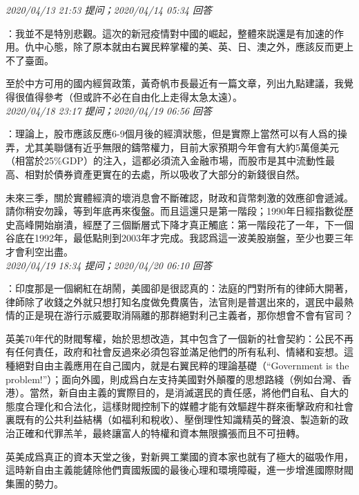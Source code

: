 \documentclass[twocolumn]{ctexart}
\begin{document}
\textit{\hfill\noindent\small 2020/04/13 21:53 提问；2020/04/14 05:34 回答}

：我並不是特別悲觀。這次的新冠疫情對中國的崛起，整體來説還是有加速的作用。仇中心態，除了原本就由右翼民粹掌權的美、英、日、澳之外，應該反而更上不了臺面。

至於中方可用的國内經貿政策，黃奇帆市長最近有一篇文章，列出九點建議，我覺得很值得參考（但或許不必在自由化上走得太急太遠）。
\\

\textit{\hfill\noindent\small 2020/04/18 23:17 提问；2020/04/19 06:56 回答}

：理論上，股市應該反應6-9個月後的經濟狀態，但是實際上當然可以有人爲的操弄，尤其美聯儲有近乎無限的鑄幣權力，目前大家預期今年會有大約5萬億美元（相當於25\%GDP）的注入，這都必須流入金融市場，而股市是其中流動性最高、相對於債券資產更實在的去處，所以吸收了大部分的新錢很自然。

未來三季，關於實體經濟的壞消息會不斷確認，財政和貨幣刺激的效應卻會遞減。請你稍安勿躁，等到年底再來復盤。而且這還只是第一階段；1990年日經指數從歷史高峰開始崩潰，經歷了三個斷層式下降才真正觸底：第一階段花了一年，下一個谷底在1992年，最低點則到2003年才完成。我認爲這一波美股崩盤，至少也要三年才會利空出盡。
\\

\textit{\hfill\noindent\small 2020/04/19 18:34 提问；2020/04/20 06:10 回答}

：印度那是一個網紅在胡鬧，美國卻是很認真的：法庭的門對所有的律師大開著，律師除了收錢之外就只想打知名度做免費廣告，法官則是普選出來的，選民中最熱情的正是現在游行示威要取消隔離的那群絕對利己主義者，那你想會不會有官司？

英美70年代的財閥奪權，始於思想改造，其中包含了一個新的社會契約：公民不再有任何責任，政府和社會反過來必須包容並滿足他們的所有私利、情緒和妄想。這種絕對自由主義應用在自己國内，就是右翼民粹的理論基礎（“Government is the problem!”）；面向外國，則成爲白左支持美國對外顛覆的思想路綫（例如台灣、香港）。當然，新自由主義的實際目的，是消滅選民的責任感，將他們自私、自大的態度合理化和合法化，這樣財閥控制下的媒體才能有效驅趕牛群來衝擊政府和社會裏既有的公共利益結構（如福利和稅收）、壓倒理性知識精英的聲浪、製造新的政治正確和代罪羔羊，最終讓富人的特權和資本無限擴張而且不可扭轉。

英美成爲真正的資本天堂之後，對新興工業國的資本家也就有了極大的磁吸作用，這時新自由主義能鏟除他們賣國叛國的最後心理和環境障礙，進一步增進國際財閥集團的勢力。
\\
\end{document}
